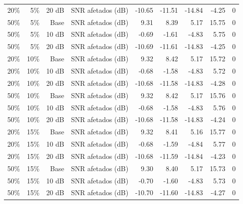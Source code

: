 \begin{tabular}{lrrrrrrrr}
20\% & 5\% & 20 dB & SNR afetados (dB) & -10.65 & -11.51 & -14.84 & -4.25 & 0 \\
50\% & 5\% & Base & SNR afetados (dB) & 9.31 & 8.39 & 5.17 & 15.75 & 0 \\
50\% & 5\% & 10 dB & SNR afetados (dB) & -0.69 & -1.61 & -4.83 & 5.75 & 0 \\
50\% & 5\% & 20 dB & SNR afetados (dB) & -10.69 & -11.61 & -14.83 & -4.25 & 0 \\
20\% & 10\% & Base & SNR afetados (dB) & 9.32 & 8.42 & 5.17 & 15.72 & 0 \\
20\% & 10\% & 10 dB & SNR afetados (dB) & -0.68 & -1.58 & -4.83 & 5.72 & 0 \\
20\% & 10\% & 20 dB & SNR afetados (dB) & -10.68 & -11.58 & -14.83 & -4.28 & 0 \\
50\% & 10\% & Base & SNR afetados (dB) & 9.32 & 8.42 & 5.17 & 15.76 & 0 \\
50\% & 10\% & 10 dB & SNR afetados (dB) & -0.68 & -1.58 & -4.83 & 5.76 & 0 \\
50\% & 10\% & 20 dB & SNR afetados (dB) & -10.68 & -11.58 & -14.83 & -4.24 & 0 \\
20\% & 15\% & Base & SNR afetados (dB) & 9.32 & 8.41 & 5.16 & 15.77 & 0 \\
20\% & 15\% & 10 dB & SNR afetados (dB) & -0.68 & -1.59 & -4.84 & 5.77 & 0 \\
20\% & 15\% & 20 dB & SNR afetados (dB) & -10.68 & -11.59 & -14.84 & -4.23 & 0 \\
50\% & 15\% & Base & SNR afetados (dB) & 9.30 & 8.40 & 5.17 & 15.73 & 0 \\
50\% & 15\% & 10 dB & SNR afetados (dB) & -0.70 & -1.60 & -4.83 & 5.73 & 0 \\
50\% & 15\% & 20 dB & SNR afetados (dB) & -10.70 & -11.60 & -14.83 & -4.27 & 0 \\
\bottomrule
\end{tabular}
